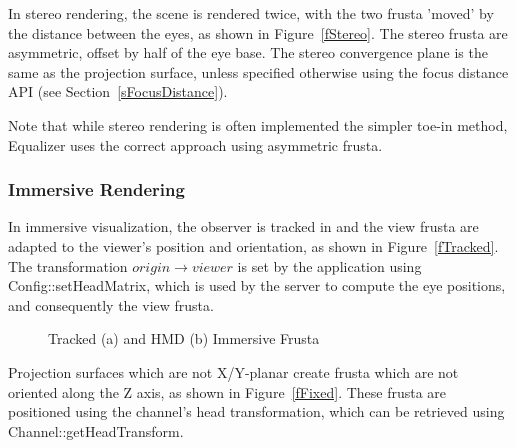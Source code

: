 \documentclass[10pt,a4]{scrartcl}
\newcommand{\fig}[1]{Figure~\ref{#1}}
\newcommand{\sref}[1]{Section~\ref{#1}}
\begin{document}
In stereo rendering, the scene is rendered twice, with the two frusta
'moved' by the distance between the eyes, as shown in \fig{fStereo}. The stereo
frusta are asymmetric, offset by half of the eye base. The stereo convergence
plane is the same as the projection surface, unless specified otherwise using
the focus distance API (see \sref{sFocusDistance}).

Note that while stereo rendering is often implemented the simpler toe-in method,
Equalizer uses the correct approach using asymmetric frusta.

\subsubsection{Immersive Rendering}

In immersive visualization, the observer is tracked in and the view
frusta are adapted to the viewer's position and orientation, as shown
in \fig{fTracked}. The transformation $origin \rightarrow viewer$ is set by
the application using \textsf{Config::setHead\-Matrix}, which is used by
the server to compute the eye positions, and consequently the view frusta.

\begin{figure}[h!t]\center
  \hfil
  {\caption{\label{fImmersive}Tracked (a) and HMD (b) Immersive Frusta}}
\end{figure}

Projection surfaces which are not X/Y-planar create frusta which are not
oriented along the Z axis, as shown in \fig{fFixed}. These frusta are positioned
using the channel's head transformation, which can be retrieved using
\textsf{Channel::getHeadTransform}.
\end{document}
